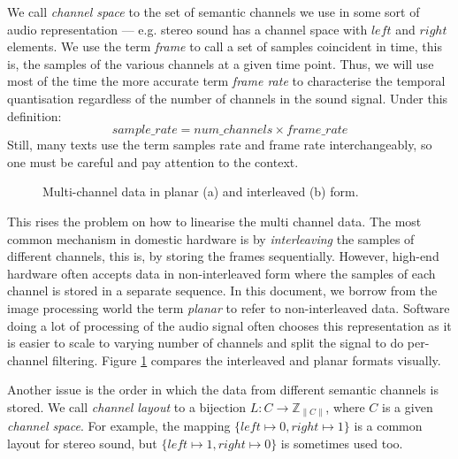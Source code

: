We call \emph{channel space} to the set of
semantic channels we use in some sort of audio representation ---
e.g. stereo sound has a channel space with $left$ and $right$
elements. We use the term \emph{frame} to call a
set of samples coincident in time, this is, the samples of the various
channels at a given time point. Thus, we will use most of the time the
more accurate term \emph{frame rate} to characterise
the temporal quantisation regardless of the number of channels in the
sound signal. Under this definition:
\begin{equation}
sample\_rate = num\_channels \times frame\_rate
\end{equation}
Still, many texts use the term samples rate and frame rate
interchangeably, so one must be careful and pay attention to the
context.

\begin{figure}[h]
  \centering
  \;
  \caption{Multi-channel data in planar (a) and interleaved (b) form.}
  \label{fig:interleaving}
\end{figure}

This rises the problem on how to linearise the multi channel data. The
most common mechanism in domestic hardware is by
\emph{interleaving} the samples of different
channels, this is, by storing the frames sequentially. However,
high-end hardware often accepts data in non-interleaved form where the
samples of each channel is stored in a separate sequence. In this
document, we borrow from the image processing world the term
\emph{planar} to refer to
non-interleaved data. Software doing a lot of processing of the audio
signal often chooses this representation as it is easier to scale to
varying number of channels and split the signal to do per-channel
filtering. Figure \ref{fig:interleaving} compares the
interleaved and planar formats visually.

Another issue is the order in which the data from different semantic
channels is stored. We call 
\emph{channel layout} to a bijection $L : C \rightarrow
\mathbb{Z}_{\|C\|}$, where $C$ is a given \emph{channel space}. For
example, the mapping $\{ left \mapsto 0, right \mapsto 1 \}$ is a
common layout for stereo sound, but $\{ left \mapsto 1, right \mapsto
0 \}$ is sometimes used too.


